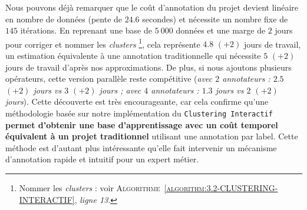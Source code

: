 			Nous pouvons déjà remarquer que le coût d'annotation du projet devient linéaire en nombre de données (pente de $24.6$ secondes) et nécessite un nombre fixe de $145$ itérations.
			En reprenant une base de $5~000$ données et une marge de $2$ jours pour corriger et nommer les \textit{clusters} \footnote{
				Nommer les \textit{clusters} : voir \textsc{Algorithme~\ref{algorithm:3.2-CLUSTERING-INTERACTIF}}, \textit{ligne 13}.
			}, cela représente $4.8$ {\footnotesize $(+2)$} jours de travail, un estimation équivalente à une annotation traditionnelle qui nécessite $5 $ {\footnotesize $(+2)$} jours de travail d'après nos approximations.
			De plus, si nous ajoutons plusieurs opérateurs, cette version parallèle reste compétitive (\textit{avec $2$ annotateurs : $2.5$ {\footnotesize $(+2)$} jours vs $3$ {\footnotesize $(+2)$} jours ; avec $4$ annotateurs : $1.3$ jours vs $2$ {\footnotesize $(+2)$} jours}).
			Cette découverte est très encourageante, car cela confirme qu'une méthodologie basée sur notre implémentation du \texttt{Clustering Interactif} \textbf{permet d'obtenir une base d'apprentissage avec un coût temporel équivalent à un projet traditionnel} utilisant une annotation par label.
			Cette méthode est d'autant plus intéressante qu'elle fait intervenir un mécanisme d'annotation rapide et intuitif pour un expert métier.
			
